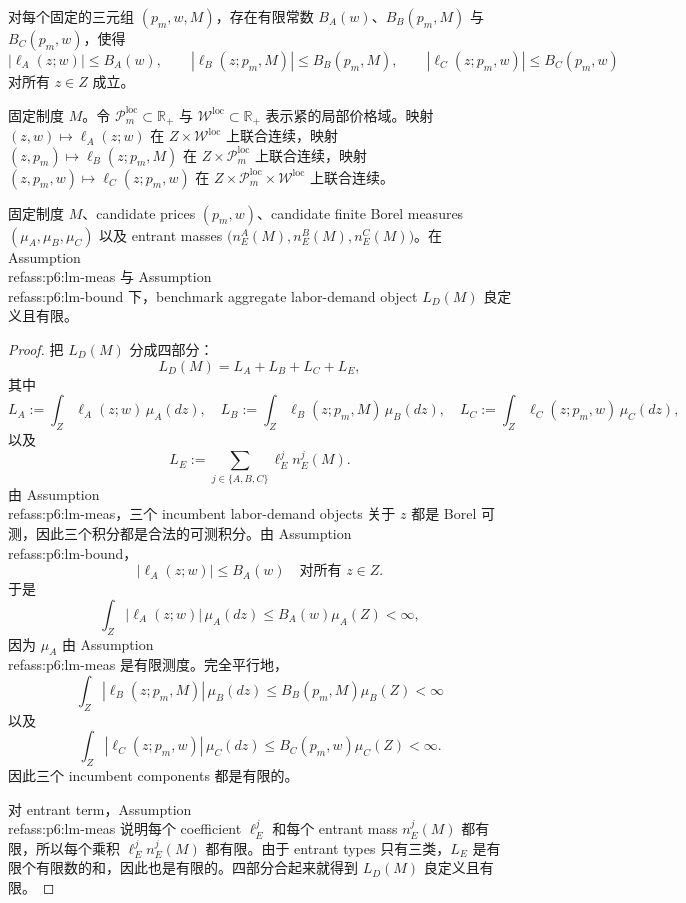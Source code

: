 \begin{assumption}[固定候选价格下的劳动需求有界性]\label{ass:p6:lm-bound}
对每个固定的三元组 $(p_m,w,M)$，存在有限常数 $B_A(w)$、$B_B(p_m,M)$ 与 $B_C(p_m,w)$，使得
\[
|\ell_A(z;w)|\le B_A(w),\qquad
|\ell_B(z;p_m,M)|\le B_B(p_m,M),\qquad
|\ell_C(z;p_m,w)|\le B_C(p_m,w)
\]
对所有 $z\in Z$ 成立。
\end{assumption}

\begin{assumption}[候选价格的局部连续性]\label{ass:p6:lm-cont}
固定制度 $M$。令 $\mathcal P_m^{\mathrm{loc}}\subset\mathbb R_+$ 与 $\mathcal W^{\mathrm{loc}}\subset\mathbb R_+$ 表示紧的局部价格域。映射 $(z,w)\mapsto \ell_A(z;w)$ 在 $Z\times\mathcal W^{\mathrm{loc}}$ 上联合连续，映射 $(z,p_m)\mapsto \ell_B(z;p_m,M)$ 在 $Z\times\mathcal P_m^{\mathrm{loc}}$ 上联合连续，映射 $(z,p_m,w)\mapsto \ell_C(z;p_m,w)$ 在 $Z\times\mathcal P_m^{\mathrm{loc}}\times\mathcal W^{\mathrm{loc}}$ 上联合连续。
\end{assumption}

\begin{proposition}[总劳动需求的良定义性]
固定制度 $M$、candidate prices $(p_m,w)$、candidate finite Borel measures $(\mu_A,\mu_B,\mu_C)$ 以及 entrant masses $\bigl(n_E^A(M),n_E^B(M),n_E^C(M)\bigr)$。在 Assumption~\\ref{ass:p6:lm-meas} 与 Assumption~\\ref{ass:p6:lm-bound} 下，benchmark aggregate labor-demand object $L_D(M)$ 良定义且有限。
\end{proposition}

\begin{proof}
把 $L_D(M)$ 分成四部分：
\[
L_D(M)=L_A+L_B+L_C+L_E,
\]
其中
\[
L_A:=\int_Z \ell_A(z;w)\,\mu_A(dz),\quad
L_B:=\int_Z \ell_B(z;p_m,M)\,\mu_B(dz),\quad
L_C:=\int_Z \ell_C(z;p_m,w)\,\mu_C(dz),
\]
以及
\[
L_E:=\sum_{j\in\{A,B,C\}}\ell_E^j n_E^j(M).
\]
由 Assumption~\\ref{ass:p6:lm-meas}，三个 incumbent labor-demand objects 关于 $z$ 都是 Borel 可测，因此三个积分都是合法的可测积分。由 Assumption~\\ref{ass:p6:lm-bound}，
\[
|\ell_A(z;w)|\le B_A(w)\quad\text{对所有 } z\in Z.
\]
于是
\[
\int_Z |\ell_A(z;w)|\,\mu_A(dz)\le B_A(w)\mu_A(Z)<\infty,
\]
因为 $\mu_A$ 由 Assumption~\\ref{ass:p6:lm-meas} 是有限测度。完全平行地，
\[
\int_Z |\ell_B(z;p_m,M)|\,\mu_B(dz)\le B_B(p_m,M)\mu_B(Z)<\infty
\]
以及
\[
\int_Z |\ell_C(z;p_m,w)|\,\mu_C(dz)\le B_C(p_m,w)\mu_C(Z)<\infty.
\]
因此三个 incumbent components 都是有限的。

对 entrant term，Assumption~\\ref{ass:p6:lm-meas} 说明每个 coefficient $\ell_E^j$ 和每个 entrant mass $n_E^j(M)$ 都有限，所以每个乘积 $\ell_E^j n_E^j(M)$ 都有限。由于 entrant types 只有三类，$L_E$ 是有限个有限数的和，因此也是有限的。四部分合起来就得到 $L_D(M)$ 良定义且有限。
\end{proof}

